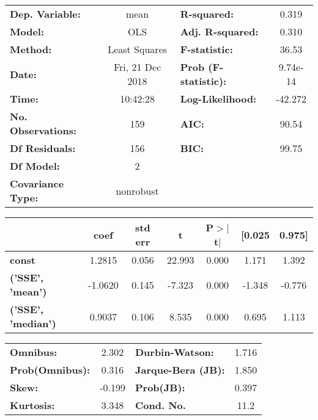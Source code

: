\begin{center}
\begin{tabular}{lclc}
\toprule
\textbf{Dep. Variable:}    &       mean       & \textbf{  R-squared:         } &    0.319  \\
\textbf{Model:}            &       OLS        & \textbf{  Adj. R-squared:    } &    0.310  \\
\textbf{Method:}           &  Least Squares   & \textbf{  F-statistic:       } &    36.53  \\
\textbf{Date:}             & Fri, 21 Dec 2018 & \textbf{  Prob (F-statistic):} & 9.74e-14  \\
\textbf{Time:}             &     10:42:28     & \textbf{  Log-Likelihood:    } &  -42.272  \\
\textbf{No. Observations:} &         159      & \textbf{  AIC:               } &    90.54  \\
\textbf{Df Residuals:}     &         156      & \textbf{  BIC:               } &    99.75  \\
\textbf{Df Model:}         &           2      & \textbf{                     } &           \\
\textbf{Covariance Type:}  &    nonrobust     & \textbf{                     } &           \\
\bottomrule
\end{tabular}
\end{center}\begin{center}
\begin{tabular}{lcccccc}
\toprule
                                & \textbf{coef} & \textbf{std err} & \textbf{t} & \textbf{P$>$$|$t$|$} & \textbf{[0.025} & \textbf{0.975]}  \\
\midrule
\textbf{const}                  &       1.2815  &        0.056     &    22.993  &         0.000        &        1.171    &        1.392     \\
\textbf{('SSE', 'mean')}   &      -1.0620  &        0.145     &    -7.323  &         0.000        &       -1.348    &       -0.776     \\
\textbf{('SSE', 'median')} &       0.9037  &        0.106     &     8.535  &         0.000        &        0.695    &        1.113     \\
\bottomrule
\end{tabular}
\end{center}\begin{center}
\begin{tabular}{lclc}
\toprule
\textbf{Omnibus:}       &  2.302 & \textbf{  Durbin-Watson:     } &    1.716  \\
\textbf{Prob(Omnibus):} &  0.316 & \textbf{  Jarque-Bera (JB):  } &    1.850  \\
\textbf{Skew:}          & -0.199 & \textbf{  Prob(JB):          } &    0.397  \\
\textbf{Kurtosis:}      &  3.348 & \textbf{  Cond. No.          } &     11.2  \\
\bottomrule
\end{tabular}
\end{center}